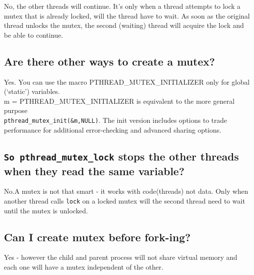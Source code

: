 No, the other threads will continue. It's only when a thread attempts to
lock a mutex that is already locked, will the thread have to wait. As
soon as the original thread unlocks the mutex, the second (waiting)
thread will acquire the lock and be able to continue.

\subsection{Are there other ways to create a
mutex?}\label{are-there-other-ways-to-create-a-mutex}

Yes. You can use the macro PTHREAD\_MUTEX\_INITIALIZER only for global
(`static') variables.\\m = PTHREAD\_MUTEX\_INITIALIZER is equivalent to
the more general purpose\\\texttt{pthread\_mutex\_init(\&m,NULL)}. The
init version includes options to trade performance for additional
error-checking and advanced sharing options.

\begin{Shaded}
\begin{Highlighting}[]
\end{Highlighting}
\end{Shaded}

\subsection{\texorpdfstring{\texttt{So\ pthread\_mutex\_lock} stops the
other threads when they read the same
variable?}{So pthread\_mutex\_lock stops the other threads when they read the same variable?}}\label{so-pthreadux5fmutexux5flock-stops-the-other-threads-when-they-read-the-same-variable}

No.A mutex is not that smart - it works with code(threads) not data.
Only when another thread calls \texttt{lock} on a locked mutex will the
second thread need to wait until the mutex is unlocked.

\subsection{Can I create mutex before
fork-ing?}\label{can-i-create-mutex-before-fork-ing}

Yes - however the child and parent process will not share virtual memory
and each one will have a mutex independent of the other.

